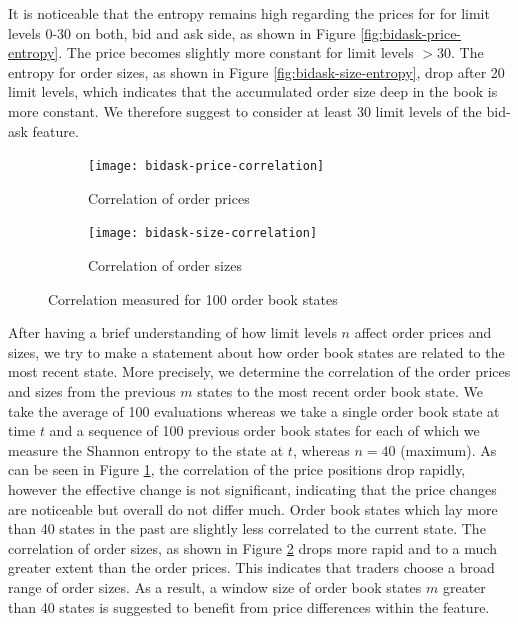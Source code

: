 It is noticeable that the entropy remains high regarding the prices for for limit levels 0-30 on both, bid and ask side, as shown in Figure \ref{fig:bidask-price-entropy}. 
The price becomes slightly more constant for limit levels $>30$. 
The entropy for order sizes, as shown in Figure \ref{fig:bidask-size-entropy}, drop after 20 limit levels, which indicates that the accumulated order size deep in the book is more constant. 
We therefore suggest to consider at least 30 limit levels of the bid-ask feature.

\begin{figure}[H]
    \centering
    \begin{subfigure}[b]{0.45\textwidth}
        \texttt{[image: bidask-price-correlation]}
        \caption{Correlation of order prices}
        \label{fig:bidask-price-correlation}
    \end{subfigure}
    \begin{subfigure}[b]{0.45\textwidth}
        \texttt{[image: bidask-size-correlation]}
        \caption{Correlation of order sizes}
        \label{fig:bidask-size-correlation}
    \end{subfigure}
    \caption{Correlation measured for 100 order book states}\label{fig:bidask-correlation}
\end{figure}

After having a brief understanding of how limit levels $n$ affect order prices and sizes, we try to make a statement about how order book states are related to the most recent state.
More precisely, we determine the correlation of the order prices and sizes from the previous $m$ states to the most recent order book state.
We take the average of 100 evaluations whereas we take a single order book state at time $t$ and a sequence of 100 previous order book states for each of which we measure the Shannon entropy\cite{shannon2001mathematical} to the state at $t$, whereas $n=40$ (maximum).
As can be seen in Figure \ref{fig:bidask-price-correlation}, the correlation of the price positions drop rapidly, however the effective change is not significant, indicating that the price changes are noticeable but overall do not differ much.
Order book states which lay more than 40 states in the past are slightly less correlated to the current state.
The correlation of order sizes, as shown in Figure \ref{fig:bidask-size-correlation} drops more rapid and to a much greater extent than the order prices.
This indicates that traders choose a broad range of order sizes.
As a result, a window size of order book states $m$ greater than 40 states is suggested to benefit from price differences within the feature.

